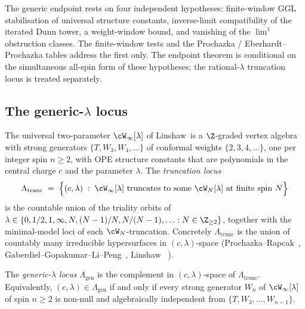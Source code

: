 The generic endpoint rests on four independent hypotheses:
finite-window GGL stabilisation of universal structure constants,
inverse-limit compatibility of the iterated Dunn tower, a
weight-window bound, and vanishing of the \(\lim^1\) obstruction
classes. The finite-window tests and the
Prochazka / Eberhardt--Prochazka tables address the first only.
The endpoint theorem is conditional on the simultaneous all-spin
form of these hypotheses; the rational-$\lambda$ truncation locus
is treated separately.

\subsection{The generic-\texorpdfstring{$\lambda$}{lambda} locus}
\label{subsec:generic-lambda-locus}

The universal two-parameter $\cW_\infty[\lambda]$ of
Linshaw\,\cite{Linshaw-Winfty-universal} is a $\Z$-graded vertex algebra
with strong generators $\{T, W_3, W_4, \ldots\}$ of conformal weights
$\{2, 3, 4, \ldots\}$, one per integer spin $n \ge 2$, with OPE
structure constants that are polynomials in the central charge $c$
and the parameter $\lambda$. The \emph{truncation locus}
\begin{equation}\label{eq:truncation-locus}
\Lambda_{\mathrm{trunc}} \;=\;
\Bigl\{ (c, \lambda) \;:\; \cW_\infty[\lambda]\text{ truncates to some }
\cW_N[\lambda] \text{ at finite spin } N \Bigr\}
\end{equation}
is the countable union of the triality orbits of $\lambda \in
\{0, 1/2, 1, \infty, N, (N-1)/N, N/(N-1), \ldots : N \in \Z_{\ge 2}\}$,
together with the minimal-model loci of each $\cW_N$-truncation.
Concretely $\Lambda_{\mathrm{trunc}}$ is the union of countably many
irreducible hypersurfaces in $(c, \lambda)$-space
\textup{(}Prochazka--Rapcak~\cite{ProchazkaRapcak18}, Gaberdiel--Gopakumar--Li--Peng~\cite{%
GaberdielGopakumarLiPeng-Winfty}, Linshaw~\cite{Linshaw-Winfty-universal}
\textup{)}.

\begin{definition}
\label{def:generic-lambda-locus}
The \emph{generic-$\lambda$ locus} $\Lambda_{\mathrm{gen}}$ is the
complement in $(c, \lambda)$-space of $\Lambda_{\mathrm{trunc}}$.
Equivalently, $(c, \lambda) \in \Lambda_{\mathrm{gen}}$ if and only if
every strong generator $W_n$ of $\cW_\infty[\lambda]$ of spin $n \ge 2$
is non-null and algebraically independent from $\{T, W_3, \ldots,
W_{n-1}\}$.
\end{definition}

